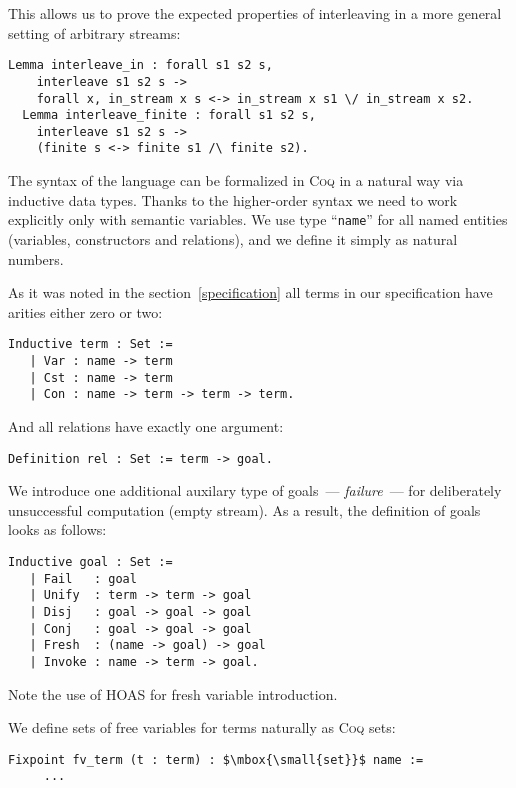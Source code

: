 This allows us to prove the expected properties of interleaving in a more general setting of arbitrary streams:

\begin{lstlisting}[language=Coq]
  Lemma interleave_in : forall s1 s2 s,
    interleave s1 s2 s ->
    forall x, in_stream x s <-> in_stream x s1 \/ in_stream x s2.
  Lemma interleave_finite : forall s1 s2 s,
    interleave s1 s2 s ->
    (finite s <-> finite s1 /\ finite s2).
\end{lstlisting}

The syntax of the language can be formalized in \textsc{Coq} in a natural way via inductive data types. Thanks to the higher-order syntax we need to work explicitly only with semantic variables. We use type ``\lstinline[language=Coq]{name}'' for all named entities (variables, constructors and relations), and we define it simply as natural numbers.

As it was noted in the section~\ref{specification} all terms in our specification have arities either zero or two:

\begin{lstlisting}[language=Coq] 
   Inductive term : Set :=
   | Var : name -> term
   | Cst : name -> term
   | Con : name -> term -> term -> term.
\end{lstlisting}

And all relations have exactly one argument:

\begin{lstlisting}[language=Coq]
   Definition rel : Set := term -> goal.
\end{lstlisting}

We introduce one additional auxilary type of goals~--- \emph{failure}~--- for deliberately unsuccessful computation (empty stream). As a result, the definition of goals looks as follows:

\begin{lstlisting}[language=Coq] 
   Inductive goal : Set :=
   | Fail   : goal
   | Unify  : term -> term -> goal
   | Disj   : goal -> goal -> goal
   | Conj   : goal -> goal -> goal
   | Fresh  : (name -> goal) -> goal
   | Invoke : name -> term -> goal.
\end{lstlisting}

Note the use of HOAS for fresh variable introduction.

We define sets of free variables for terms naturally as \textsc{Coq} sets:

\begin{lstlisting}[language=Coq,mathescape=true] 
   Fixpoint fv_term (t : term) : $\mbox{\small{set}}$ name :=
     ...
\end{lstlisting}

